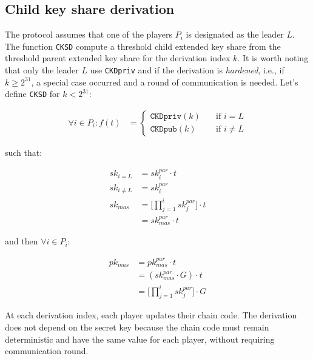 \subsection{Child key share derivation}

The protocol assumes that one of the players $P_i$ is designated as the leader
$L$. The function \texttt{CKSD} compute a threshold child extended key share
from the threshold parent extended key share for the derivation index $k$. It is
worth noting that only the leader $L$ use \texttt{CKDpriv} and if the derivation
is \textit{hardened}, i.e., if $k \geq 2^{31}$, a special case occurred and a
round of communication is needed. Let's define \texttt{CKSD} for $k < 2^{31}$:

\begin{equation}
\begin{split}
  \forall i \in P_i : f(t) &=
  \begin{cases}
    \texttt{CKDpriv}(k) & \quad \text{if } i = L\\%
    \texttt{CKDpub}(k) & \quad \text{if } i \neq L
  \end{cases}
\end{split}
\end{equation}

such that:

\begin{equation}
\begin{split}
  sk_{i = L} &= sk_{i}^{par} \cdot t \\
  sk_{i \neq L} &= sk_{i}^{par} \\
  sk_{mas} &= \Bigg[ \prod_{j=1}^{i} sk_{j}^{par} \Bigg] \cdot t \\
       &= sk_{mas}^{par} \cdot t
\end{split}
\end{equation}

and then $\forall i \in P_i$:

\begin{equation}
\begin{split}
  pk_{mas} &= pk_{mas}^{par} \cdot t \\
       &= (sk_{mas}^{par} \cdot G) \cdot t \\
       &= \Bigg[ \prod_{j=1}^{i} sk_{j}^{par} \Bigg] \cdot G
\end{split}
\end{equation}

At each derivation index, each player updates their chain code. The derivation
does not depend on the secret key because the chain code must remain
deterministic and have the same value for each player, without requiring
communication round.


